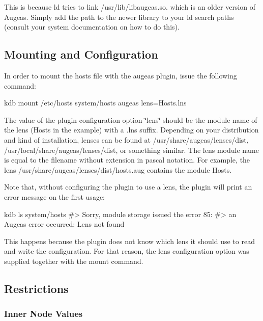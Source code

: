 This is because {\ttfamily ld} tries to link {\ttfamily /usr/lib/libaugeas.so.} which is an older version of Augeas. Simply add the path to the newer library to your ld search paths (consult your system documentation on how to do this).

\subsection*{Mounting and Configuration}

In order to mount the hosts file with the augeas plugin, issue the following command\+:


\begin{DoxyCode}
kdb mount /etc/hosts system/hosts augeas lens=Hosts.lns
\end{DoxyCode}


The value of the plugin configuration option \char`\"{}lens\char`\"{} should be the module name of the lens (Hosts in the example) with a \textquotesingle{}.lns\textquotesingle{} suffix. Depending on your distribution and kind of installation, lenses can be found at {\ttfamily /usr/share/augeas/lenses/dist}, {\ttfamily /usr/local/share/augeas/lenses/dist}, or something similar. The lens module name is equal to the filename without extension in pascal notation. For example, the lens {\ttfamily /usr/share/augeas/lenses/dist/hosts.aug} contains the module Hosts.

Note that, without configuring the plugin to use a lens, the plugin will print an error message on the first usage\+:


\begin{DoxyCode}
kdb ls system/hosts
#> Sorry, module storage issued the error 85:
#> an Augeas error occurred: Lens not found
\end{DoxyCode}


This happens because the plugin does not know which lens it should use to read and write the configuration. For that reason, the lens configuration option was supplied together with the mount command.

\subsection*{Restrictions}

\subsubsection*{Inner Node Values}

